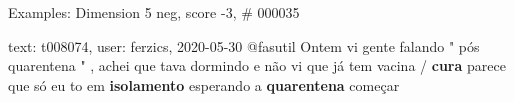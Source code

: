 \begin{frame}{Examples: Dimension 5 neg, score -3, \# 000035}
\footnotesize
\begin{alertblock}{text: t008074, user: ferzics, 2020-05-30}
@fasutil Ontem vi gente falando " pós quarentena " , achei que tava dormindo e 
não vi que já tem vacina / \textbf{cura} 
 parece que só eu to em 
\textbf{isolamento} esperando a \textbf{quarentena} começar 
\end{alertblock}
\end{frame}
